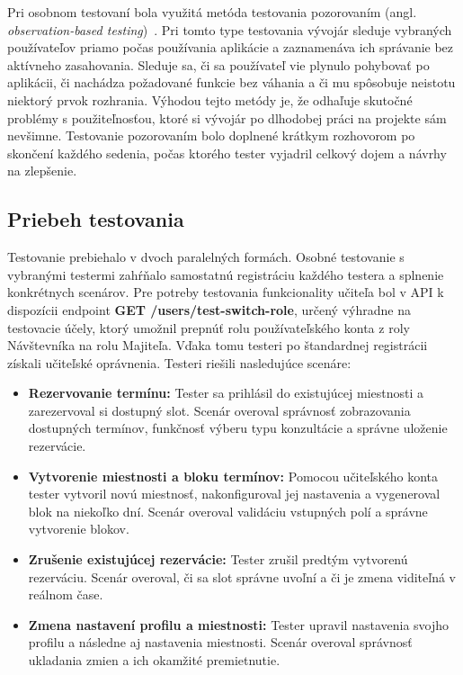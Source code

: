 Pri osobnom testovaní bola využitá metóda testovania pozorovaním 
(angl. \textit{observation-based testing})~\cite{krug_rocket}. 
Pri tomto type testovania vývojár sleduje vybraných používateľov 
priamo počas používania aplikácie a zaznamenáva ich správanie 
bez aktívneho zasahovania. Sleduje sa, či sa používateľ vie 
plynulo pohybovať po aplikácii, či nachádza požadované funkcie 
bez váhania a či mu spôsobuje neistotu niektorý prvok rozhrania. 
Výhodou tejto metódy je, že odhaľuje skutočné problémy s použiteľnosťou, 
ktoré si vývojár po dlhodobej práci na projekte sám nevšimne. 
Testovanie pozorovaním bolo doplnené krátkym rozhovorom 
po skončení každého sedenia, počas ktorého tester vyjadril 
celkový dojem a návrhy na zlepšenie.
\subsection{Priebeh testovania}

Testovanie prebiehalo v dvoch paralelných formách. Osobné testovanie
s vybranými testermi zahŕňalo samostatnú registráciu každého testera
a splnenie konkrétnych scenárov. Pre potreby testovania funkcionality
učiteľa bol v API k dispozícii endpoint
\textbf{GET /users/test-switch-role}, určený výhradne na testovacie
účely, ktorý umožnil prepnúť rolu používateľského konta
z roly Návštevníka na rolu Majiteľa. Vďaka tomu testeri po
štandardnej registrácii získali učiteľské oprávnenia. Testeri riešili nasledujúce scenáre:

\begin{itemize}
    \item \textbf{Rezervovanie termínu:} Tester sa prihlásil do 
          existujúcej miestnosti a zarezervoval si dostupný slot. 
          Scenár overoval správnosť zobrazovania dostupných termínov, 
          funkčnosť výberu typu konzultácie a správne uloženie rezervácie.
        \item \textbf{Vytvorenie miestnosti a bloku termínov:} Pomocou 
          učiteľského konta tester vytvoril novú miestnosť, nakonfiguroval 
          jej nastavenia a vygeneroval blok na niekoľko dní. 
          Scenár overoval validáciu vstupných polí a správne vytvorenie blokov.
        \item \textbf{Zrušenie existujúcej rezervácie:} Tester zrušil 
          predtým vytvorenú rezerváciu. Scenár overoval, či sa slot 
          správne uvoľní a či je zmena viditeľná v reálnom čase.
        \item \textbf{Zmena nastavení profilu a miestnosti:} Tester upravil 
          nastavenia svojho profilu a následne aj 
          nastavenia miestnosti. Scenár overoval správnosť ukladania zmien a ich okamžité premietnutie.
\end{itemize}

